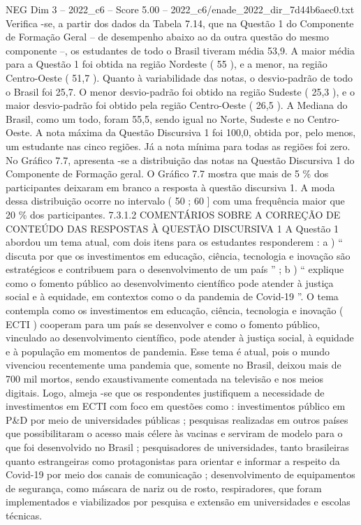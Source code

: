 \begin{textsample}{NEG Dim 3 – 2022\_c6 – Score 5.00 – 2022\_c6/enade\_2022\_dir\_7d44b6aec0.txt}
Verifica -se, a partir dos dados da Tabela 7.14, que na Questão 1 do Componente de Formação Geral – de desempenho abaixo ao da outra questão do mesmo componente –, os estudantes de todo o Brasil tiveram média 53,9.
A maior média para a Questão 1 foi obtida na região Nordeste ( 55 ), e a menor, na região Centro-Oeste ( 51,7 ).
Quanto à variabilidade das notas, o desvio-padrão de todo o Brasil foi 25,7.
O menor desvio-padrão foi obtido na região Sudeste ( 25,3 ), e o maior desvio-padrão foi obtido pela região Centro-Oeste ( 26,5 ).
A Mediana do Brasil, como um todo, foram 55,5, sendo igual no Norte, Sudeste e no Centro-Oeste.
A nota máxima da Questão Discursiva 1 foi 100,0, obtida por, pelo menos, um estudante nas cinco regiões.
Já a nota mínima para todas as regiões foi zero.
No Gráfico 7.7, apresenta -se a distribuição das notas na Questão Discursiva 1 do Componente de Formação geral.
O Gráfico 7.7 mostra que mais de 5 \% dos participantes deixaram em branco a resposta à questão discursiva 1.
A moda dessa distribuição ocorre no intervalo ( 50 ; 60 ] com uma frequência maior que 20 \% dos participantes. 7.3.1.2 COMENTÁRIOS SOBRE A CORREÇÃO DE CONTEÚDO DAS RESPOSTAS À QUESTÃO DISCURSIVA 1 A Questão 1 abordou um tema atual, com dois itens para os estudantes responderem : a ) “ discuta por que os investimentos em educação, ciência, tecnologia e inovação são estratégicos e contribuem para o desenvolvimento de um país ” ; b ) “ explique como o fomento público ao desenvolvimento científico pode atender à justiça social e à equidade, em contextos como o da pandemia de Covid-19 ”.
O tema contempla como os investimentos em educação, ciência, tecnologia e inovação ( ECTI ) cooperam para um país se desenvolver e como o fomento público, vinculado ao desenvolvimento científico, pode atender à justiça social, à equidade e à população em momentos de pandemia.
Esse tema é atual, pois o mundo vivenciou recentemente uma pandemia que, somente no Brasil, deixou mais de 700 mil mortos, sendo exaustivamente comentada na televisão e nos meios digitais.
Logo, almeja -se que os respondentes justifiquem a necessidade de investimentos em ECTI com foco em questões como : investimentos público em P\&D por meio de universidades públicas ; pesquisas realizadas em outros países que possibilitaram o acesso mais célere às vacinas e serviram de modelo para o que foi desenvolvido no Brasil ; pesquisadores de universidades, tanto brasileiras quanto estrangeiras como protagonistas para orientar e informar a respeito da Covid-19 por meio dos canais de comunicação ; desenvolvimento de equipamentos de segurança, como máscara de nariz ou de rosto, respiradores, que foram implementados e viabilizados por pesquisa e extensão em universidades e escolas técnicas.

\end{textsample}
